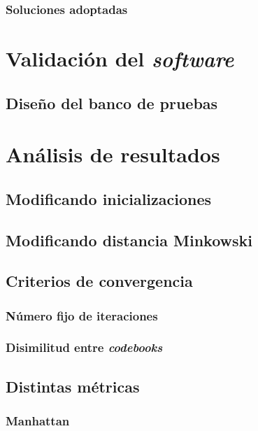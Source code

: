 \documentclass[10pt,a4paper]{article}
\begin{document}
\subsubsection{Soluciones adoptadas} 

\section{Validación del \textit{software}}

\subsection{Diseño del banco de pruebas}

\section{Análisis de resultados}

\subsection{Modificando inicializaciones}

\subsection{Modificando distancia Minkowski}

\subsection{Criterios de convergencia}

\subsubsection{Número fijo de iteraciones}

\subsubsection{Disimilitud entre \textit{codebooks}}

\subsection{Distintas métricas}

\subsubsection{Manhattan}
\end{document}
